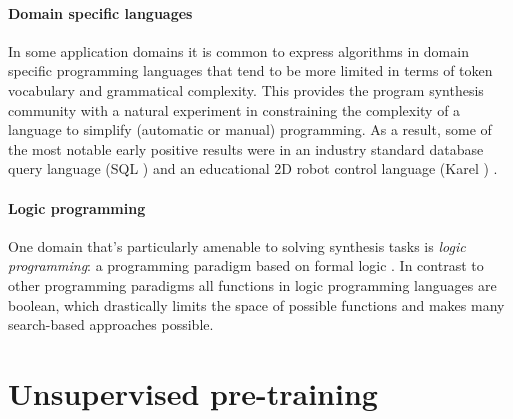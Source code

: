 \paragraph{Domain specific languages}

In some application domains it is common to express algorithms in domain specific programming languages \cite{fowlerDomainspecificLanguages2010, hudakDomainspecificLanguages1997, karsaiDesignGuidelinesDomain2014, kosarComparingGeneralpurposeDomainspecific2010, kosarDomainspecificLanguagesSystematic2016, mernikWhenHowDevelop2005} that tend to be more limited in terms of token vocabulary and grammatical complexity.
This provides the program synthesis community with a natural experiment in constraining the complexity of a language to simplify (automatic or manual) programming.
As a result, some of the most notable early positive results were in an industry standard database query language (SQL \cite{groffSQLCompleteReference2002}) \cite{liCanLlmAlready2024, yuSpiderLargescaleHumanlabeled2018} and an educational 2D robot control language (Karel \cite{pattisKarelRobotGentle1994}) \cite{metainduction}.

\paragraph{Logic programming}

One domain that's particularly amenable to solving synthesis tasks is \emph{logic programming}: a programming paradigm based on formal logic \cite{doetsLogicLogicProgramming1994, lloydFoundationsLogicProgramming2012}. 
In contrast to other programming paradigms \cite{floydParadigmsProgramming2007, gorodniaiaStudyProgrammingParadigms2016, krishnamurthi13ProgrammingParadigms2019, vanroyProgrammingParadigmsDummies2009} all functions in logic programming languages are boolean, which drastically limits the space of possible functions and makes many search-based approaches possible.



\newpage
\section{Unsupervised pre-training}
\label{sec:pretrain}

